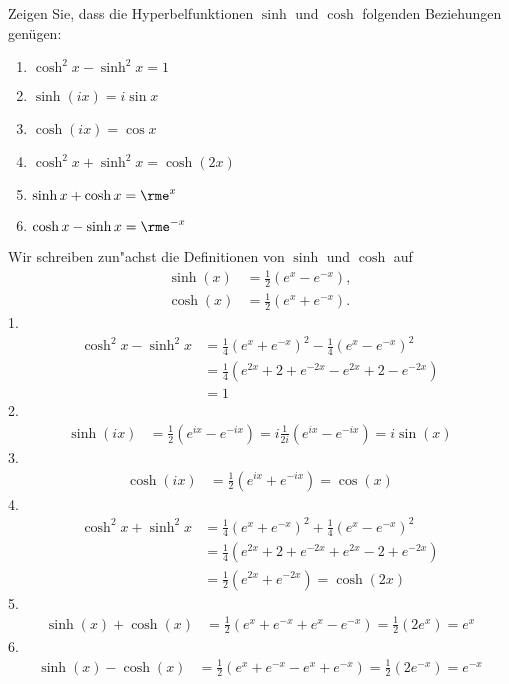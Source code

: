 \documentclass[11pt,answers]{exam}
\begin{document}
\begin{questions}


% 

Zeigen Sie, dass die Hyperbelfunktionen $\sinh$ und $\cosh$ folgenden Beziehungen genügen:\\
\parbox{0.5\textwidth}{\begin{enumerate}
\item $\cosh^2 x-\sinh^2 x=1$
\item $\sinh (ix)=i\sin x$
\item $\cosh (ix)=\cos x$
\end{enumerate}}\parbox{0.5\textwidth}{\begin{enumerate}\setcounter{enumi}{3}
\item $\cosh^2 x+\sinh^2 x=\cosh (2x)$
\item $\sinh x+\cosh x=\rme^x$
\item $\cosh x-\sinh x=\rme^{-x}$
\end{enumerate}}
\begin{solution} Wir schreiben zun"achst die Definitionen von $\sinh$ und $\cosh$ auf
\begin{align*}
\sinh(x)&=\frac{1}{2}\left(e^{x}-e^{-x}\right),
\\
\cosh(x)&=\frac{1}{2}\left(e^{x}+e^{-x}\right).
\end{align*}
1.
\begin{align*}
\cosh^2 x-\sinh^2 x
&=
\frac{1}{4} \left(e^{x}+e^{-x}\right)^2-\frac{1}{4} \left(e^x-e^{-x}\right)^2
\\
&=
\frac{1}{4} \left(e^{2x}+2+e^{-2x}-e^{2x}+2-e^{-2x}\right)
\\
&=
1
\end{align*}
2.
\begin{align*}
\sinh(ix)
&=
\frac{1}{2} \left(e^{ix}-e^{-ix}\right)
=
i\frac{1}{2i} \left(e^{ix}-e^{-ix}\right)
=
i\sin(x)
\end{align*}
3.
\begin{align*}
\cosh(ix)
&=
\frac{1}{2} \left(e^{ix}+e^{-ix}\right)
=
\cos(x)
\end{align*}
4.
\begin{align*}
\cosh^2 x+\sinh^2 x
&=
\frac{1}{4} \left(e^{x}+e^{-x}\right)^2+\frac{1}{4} \left(e^x-e^{-x}\right)^2
\\
&=
\frac{1}{4} \left(e^{2x}+2+e^{-2x}+e^{2x}-2+e^{-2x}\right)
\\
&=
\frac{1}{2} \left(e^{2x}+e^{-2x}\right)=\cosh(2x)
\end{align*}
5.
\begin{align*}
\sinh(x)+\cosh(x)
&=
\frac{1}{2} \left(e^{x}+e^{-x}+e^{x}-e^{-x}\right)
=
\frac{1}{2} \left(2e^{x}\right)=e^x
\end{align*}
6.
\begin{align*}
\sinh(x)-\cosh(x)
&=
\frac{1}{2} \left(e^{x}+e^{-x}-e^{x}+e^{-x}\right)
=
\frac{1}{2} \left(2e^{-x}\right)=e^{-x}
\end{align*}
\end{solution}




\end{questions}
\end{document}
